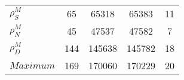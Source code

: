 \begin{center}
\begin{longtable}{lcccc}
$ {\rho^{M}_{S}}       $	 & 	                   65	 & 	                65318	 & 	                65383	 & 	                   11 \\ 
$ {\rho^{M}_{N}}       $	 & 	                   45	 & 	                47537	 & 	                47582	 & 	                    7 \\ 
$ {\rho^{M}_{D}}       $	 & 	                  144	 & 	               145638	 & 	               145782	 & 	                   18 \\ 
$Maximum               $	 & 	                  169	 & 	               170060	 & 	               170229	 & 	                   20 \\ 
\end{longtable}
 \end{center}
